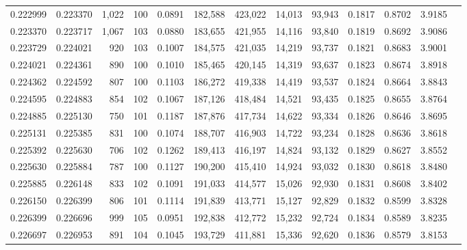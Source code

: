\begin{tabular}{rrrrrrrrrrrrr}
0.222999 & 0.223370 & 1,022 & 100 &                                     0.0891 & 182,588 & 423,022 &  14,013 &  93,943 & 0.1817 & 0.8702 & 3.9185 \\
0.223370 & 0.223717 & 1,067 & 103 &                                     0.0880 & 183,655 & 421,955 &  14,116 &  93,840 & 0.1819 & 0.8692 & 3.9086 \\
0.223729 & 0.224021 &   920 & 103 &                                     0.1007 & 184,575 & 421,035 &  14,219 &  93,737 & 0.1821 & 0.8683 & 3.9001 \\
0.224021 & 0.224361 &   890 & 100 &                                     0.1010 & 185,465 & 420,145 &  14,319 &  93,637 & 0.1823 & 0.8674 & 3.8918 \\
0.224362 & 0.224592 &   807 & 100 &                                     0.1103 & 186,272 & 419,338 &  14,419 &  93,537 & 0.1824 & 0.8664 & 3.8843 \\
0.224595 & 0.224883 &   854 & 102 &                                     0.1067 & 187,126 & 418,484 &  14,521 &  93,435 & 0.1825 & 0.8655 & 3.8764 \\
0.224885 & 0.225130 &   750 & 101 &                                     0.1187 & 187,876 & 417,734 &  14,622 &  93,334 & 0.1826 & 0.8646 & 3.8695 \\
0.225131 & 0.225385 &   831 & 100 &                                     0.1074 & 188,707 & 416,903 &  14,722 &  93,234 & 0.1828 & 0.8636 & 3.8618 \\
0.225392 & 0.225630 &   706 & 102 &                                     0.1262 & 189,413 & 416,197 &  14,824 &  93,132 & 0.1829 & 0.8627 & 3.8552 \\
0.225630 & 0.225884 &   787 & 100 &                                     0.1127 & 190,200 & 415,410 &  14,924 &  93,032 & 0.1830 & 0.8618 & 3.8480 \\
0.225885 & 0.226148 &   833 & 102 &                                     0.1091 & 191,033 & 414,577 &  15,026 &  92,930 & 0.1831 & 0.8608 & 3.8402 \\
0.226150 & 0.226399 &   806 & 101 &                                     0.1114 & 191,839 & 413,771 &  15,127 &  92,829 & 0.1832 & 0.8599 & 3.8328 \\
0.226399 & 0.226696 &   999 & 105 &                                     0.0951 & 192,838 & 412,772 &  15,232 &  92,724 & 0.1834 & 0.8589 & 3.8235 \\
0.226697 & 0.226953 &   891 & 104 &                                     0.1045 & 193,729 & 411,881 &  15,336 &  92,620 & 0.1836 & 0.8579 & 3.8153 \\

\end{tabular}
